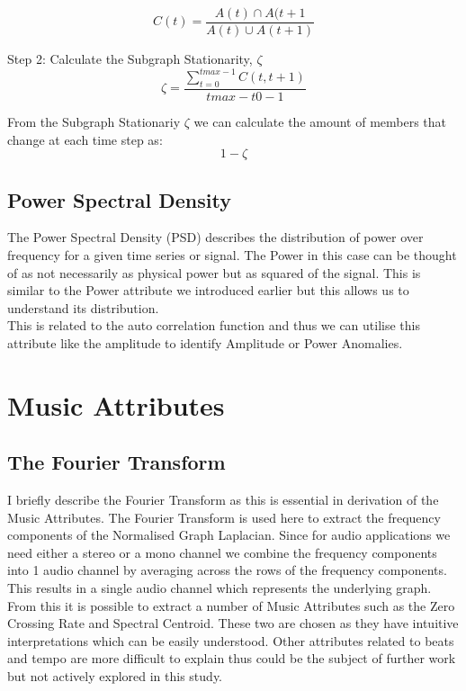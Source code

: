 \begin{equation}
    C(t) = \frac{A(t)\cap A(t+1}{A(t) \cup A(t+1)}
\end{equation}


Step 2: Calculate the Subgraph Stationarity, $\zeta$
\begin{equation}
    \zeta = \frac{\sum_{t=0}^{tmax-1} C(t,t+1)}{tmax-t0-1}
\end{equation}

From the Subgraph Stationariy $\zeta$ we can calculate the amount of members that change at each time step as:
\begin{equation}
    1- \zeta
\end{equation}

\subsection{Power Spectral Density}

The Power Spectral Density (PSD) describes the distribution of power over frequency for a given time series or signal. The Power in this case can be thought of as not necessarily as physical power but as squared of the signal. This is similar to the Power attribute we introduced earlier but this allows us to understand its distribution. \cite{Miller2012}\\

This is related to the auto correlation function and thus we can utilise this attribute like the amplitude to identify Amplitude or Power Anomalies. 

\section{Music Attributes}

\subsection{The Fourier Transform}
I briefly describe the Fourier Transform as this is essential in derivation of the Music Attributes. The Fourier Transform is used here to extract the frequency components of the Normalised Graph Laplacian. Since for audio applications we need either a stereo or a mono channel we combine the frequency components into 1 audio channel by averaging across the rows of the frequency components. This results in a single audio channel which represents the underlying graph. From this it is possible to extract a number of Music Attributes such as the Zero Crossing Rate and Spectral Centroid. These two are chosen as they have intuitive interpretations which can be easily understood. Other attributes related to beats and tempo are more difficult to explain thus could be the subject of further work but not actively explored in this study. \\


